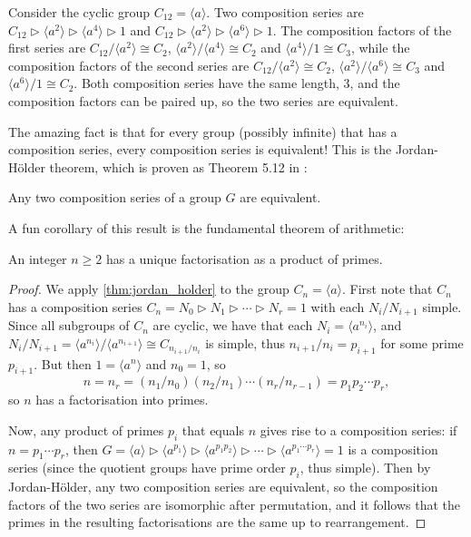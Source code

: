 \begin{example}\label{eg:composition_series}
    Consider the cyclic group $C_{12} = \langle a \rangle$. Two composition series are $C_{12} \rhd \langle a^2 \rangle \rhd \langle a^4 \rangle \rhd 1$ and $C_{12} \rhd \langle a^2 \rangle \rhd \langle a^6 \rangle \rhd 1$. The composition factors of the first series are $C_{12}/\langle a^2 \rangle \cong C_2$, $\langle a^2 \rangle/\langle a^4 \rangle \cong C_2$ and $\langle a^4 \rangle/1 \cong C_3$, while the composition factors of the second series are $C_{12}/\langle a^2 \rangle \cong C_2$, $\langle a^2 \rangle/\langle a^6 \rangle \cong C_3$ and $\langle a^6 \rangle/1 \cong C_2$. Both composition series have the same length, 3, and the composition factors can be paired up, so the two series are equivalent.
\end{example}

The amazing fact is that for every group (possibly infinite) that has a composition series, every composition series is equivalent! This is the Jordan-H\"older theorem, which is proven as Theorem 5.12 in \cite{rotman_intro_theory_groups1995}:

\begin{theorem}\label{thm:jordan_holder}
    Any two composition series of a group $G$ are equivalent.
\end{theorem}

A fun corollary of this result is the fundamental theorem of arithmetic:

\begin{corollary}\label{cor:fundamental_thm_arithmetic}
    An integer $n \geq 2$ has a unique factorisation as a product of primes.
\end{corollary}

\begin{proof}
    We apply \autoref{thm:jordan_holder} to the group $C_n = \langle a \rangle$. First note that $C_n$ has a composition series $C_n = N_0 \rhd N_1 \rhd \dotsb \rhd N_r = 1$ with each $N_i/N_{i+1}$ simple. Since all subgroups of $C_n$ are cyclic, we have that each $N_i = \langle a^{n_i} \rangle$, and $N_i/N_{i+1} = \langle a^{n_i} \rangle/\langle a^{n_{i+1}} \rangle \cong C_{n_{i+1}/n_i}$ is simple, thus $n_{i+1}/n_i = p_{i+1}$ for some prime $p_{i+1}$. But then $1 = \langle a^n \rangle$ and $n_0 = 1$, so
    $$n = n_r = (n_1/n_0)(n_2/n_1) \dotsb (n_r/n_{r-1}) = p_1 p_2 \dotsb p_r,$$
    so $n$ has a factorisation into primes.

    Now, any product of primes $p_i$ that equals $n$ gives rise to a composition series: if $n = p_1 \dotsb p_r$, then $G = \langle a \rangle \rhd \langle a^{p_1} \rangle \rhd \langle a^{p_1 p_2} \rangle \rhd \dotsb \rhd \langle a^{p_1 \dotsb p_r} \rangle = 1$ is a composition series (since the quotient groups have prime order $p_i$, thus simple). Then by Jordan-H\"older, any two composition series are equivalent, so the composition factors of the two series are isomorphic after permutation, and it follows that the primes in the resulting factorisations are the same up to rearrangement.
\end{proof}

